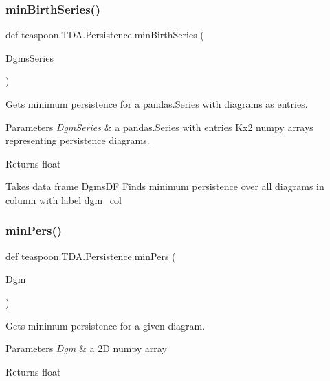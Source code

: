 \subsubsection{\texorpdfstring{min\+Birth\+Series()}{minBirthSeries()}}
{\footnotesize\ttfamily def teaspoon.\+T\+D\+A.\+Persistence.\+min\+Birth\+Series (\begin{DoxyParamCaption}\item[{}]{Dgms\+Series }\end{DoxyParamCaption})}



Gets minimum persistence for a pandas.\+Series with diagrams as entries.


\begin{DoxyParams}{Parameters}
{\em Dgm\+Series} & a pandas.\+Series with entries Kx2 numpy arrays representing persistence diagrams.\\
\hline
\end{DoxyParams}
\begin{DoxyReturn}{Returns}
float \begin{DoxyVerb}Takes data frame DgmsDF
Finds minimum persistence over all diagrams in
column with label dgm_col
\end{DoxyVerb}

\end{DoxyReturn}
\mbox{\label{namespaceteaspoon_1_1_t_d_a_1_1_persistence_aadc062063e1ed3050361dba5c7d47a0f}}
\subsubsection{\texorpdfstring{min\+Pers()}{minPers()}}
{\footnotesize\ttfamily def teaspoon.\+T\+D\+A.\+Persistence.\+min\+Pers (\begin{DoxyParamCaption}\item[{}]{Dgm }\end{DoxyParamCaption})}



Gets minimum persistence for a given diagram.


\begin{DoxyParams}{Parameters}
{\em Dgm} & a 2D numpy array\\
\hline
\end{DoxyParams}
\begin{DoxyReturn}{Returns}
float
\end{DoxyReturn}
\mbox{\label{namespaceteaspoon_1_1_t_d_a_1_1_persistence_a5ce3d1bee444c695661556eb59f70d90}}
